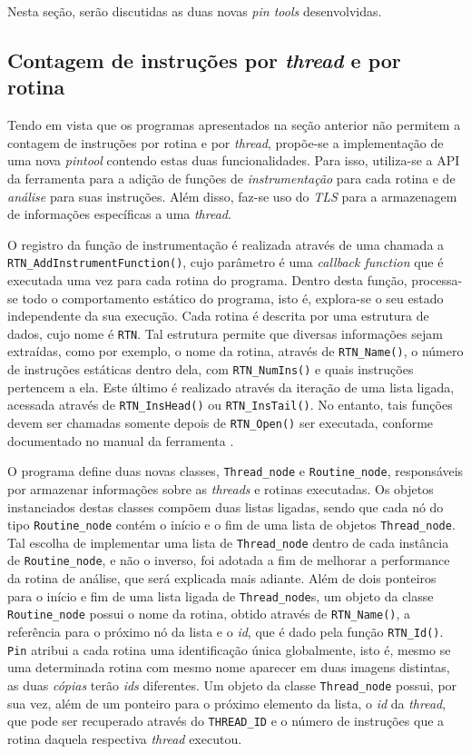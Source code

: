 \documentclass[12pt]{article}
\begin{document}
Nesta seção, serão discutidas as duas novas \textit{pin tools} desenvolvidas.

\subsection{Contagem de instruções por \textit{thread} e por rotina}

Tendo em vista que os programas apresentados na seção anterior não permitem a
contagem de instruções por rotina e por \textit{thread}, propõe-se a
implementação de uma nova \textit{pintool} contendo estas duas funcionalidades.
Para isso, utiliza-se a API da ferramenta para a adição de funções de
\textit{instrumentação} para cada rotina e de \textit{análise} para suas
instruções. Além disso, faz-se uso do \textit{TLS} para a armazenagem de
informações específicas a uma \textit{thread}.

O registro da função de instrumentação é realizada através de uma chamada a
\texttt{RTN\_AddInstrumentFunction()}, cujo  parâmetro é uma
\textit{callback function} que é executada uma vez para cada rotina do
programa. Dentro desta função, processa-se todo o comportamento estático do
programa, isto é, explora-se o seu estado independente da sua execução. Cada
rotina é descrita por uma estrutura de dados, cujo nome é \texttt{RTN}. Tal
estrutura permite que diversas informações sejam extraídas, como por exemplo, o
nome da rotina, através de \texttt{RTN\_Name()}, o número de instruções
estáticas dentro dela, com \texttt{RTN\_NumIns()} e quais instruções pertencem a
ela. Este último é realizado através da iteração de uma lista ligada, acessada
através de \texttt{RTN\_InsHead()} ou \texttt{RTN\_InsTail()}. No entanto, tais
funções devem ser chamadas somente depois de \texttt{RTN\_Open()} ser executada,
conforme documentado no manual da ferramenta  \cite{Intel:12}.

O programa define duas novas classes, \texttt{Thread\_node} e
\texttt{Routine\_node}, responsáveis por armazenar informações sobre as
\textit{threads} e rotinas executadas. Os objetos instanciados destas classes
compõem duas listas ligadas, sendo que cada nó do tipo \texttt{Routine\_node}
contém o início e o fim de uma lista de objetos \texttt{Thread\_node}. Tal
escolha de implementar uma lista de \texttt{Thread\_node} dentro de cada
instância de \texttt{Routine\_node}, e não o inverso, foi adotada a fim de
melhorar a performance da rotina de análise, que será explicada mais adiante.
Além de dois ponteiros para o início e fim de uma lista ligada de
\texttt{Thread\_node}s, um objeto da classe \texttt{Routine\_node} possui o nome
da rotina, obtido através de \texttt{RTN\_Name()}, a referência para o próximo
nó da lista e o \textit{id}, que é dado pela função \texttt{RTN\_Id()}.
\texttt{Pin} atribui a cada rotina uma identificação única globalmente, isto é, 
mesmo se uma determinada rotina com mesmo nome aparecer em duas imagens distintas,
as duas \textit{cópias} terão \textit{ids} diferentes. Um objeto da classe
\texttt{Thread\_node} possui, por sua vez, além de um ponteiro para o próximo
elemento da lista, o \textit{id} da \textit{thread}, que pode ser recuperado
através do \texttt{THREAD\_ID} e o número de instruções que a rotina daquela
respectiva \textit{thread} executou.
\end{document}
